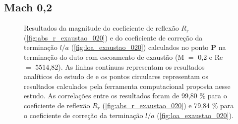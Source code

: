 \newpage
\subsection{Mach 0,2}
\begin{figure}[ht!]
\begin{subfigure}{\scaleA \textwidth}
  
\end{subfigure}%
\begin{subfigure}{\scaleA \textwidth}
  
\end{subfigure}
\caption[Resultados de $R_{r}$ e $l/a$ com escoamento de exaustão (M $=$ 0,2 e Re $=$ 5514,82)]{Resultados da magnitude do coeficiente de reflexão $R_{r}$ (\ref{fig:abs_r_exaustao_020}) e do coeficiente de correção da terminação $l/a$ (\ref{fig:loa_exaustao_020}) calculados no ponto $\textbf{P}$ na terminação do duto com escoamento de exaustão (M $=$ 0,2 e Re $=$ 5514,82). As linhas contínuas representam os resultados analíticos do estudo de  e os pontos circulares representam os resultados calculados pela ferramenta computacional proposta nesse estudo. As correlações entre os resultados foram de 99,80 \% para o coeficiente de reflexão $R_{r}$ (\ref{fig:abs_r_exaustao_020}) e 79,84 \% para o coeficiente de correção da terminação $l/a$ (\ref{fig:loa_exaustao_020}).}
\label{fig:resultados_exaustao_020}
\end{figure}

\newpage
\begin{figure}[ht!]
\centering
  
\end{figure}

\newpage
\begin{figure}[ht!]
\centering
  
\end{figure}



\newpage
